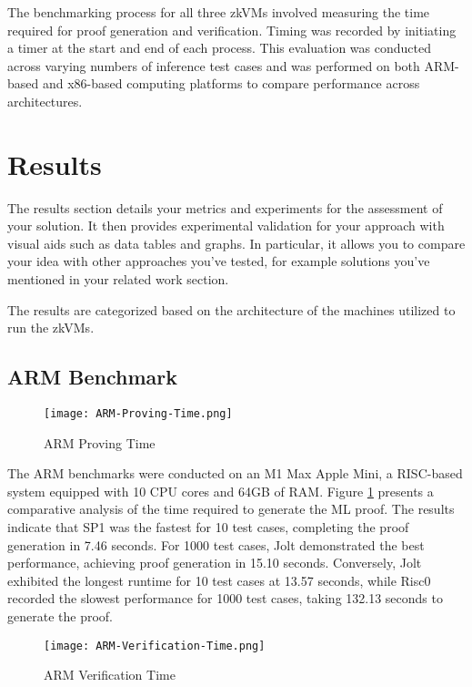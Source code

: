 \documentclass{scrartcl}
\begin{document}
The benchmarking process for all three zkVMs involved measuring the time required for proof generation and verification. Timing was recorded by initiating a timer at the start and end of each process. This evaluation was conducted across varying numbers of inference test cases and was performed on both ARM-based and x86-based computing platforms to compare performance across architectures.

\section{Results}

The results section details your metrics and experiments for the assessment of your solution. It then provides experimental validation for your approach with visual aids such as data tables and graphs. In particular, it allows you to compare your idea with other approaches you've tested, for example solutions you've mentioned in your related work section.

The results are categorized based on the architecture of the machines utilized to run the zkVMs. \subsection{ARM Benchmark}

\begin{figure}
	\begin{center}
		\texttt{[image: ARM-Proving-Time.png]}
	\end{center}
	\caption{ARM Proving Time}
	\label{graph:arm-proving-time}
\end{figure}

The ARM benchmarks were conducted on an M1 Max Apple Mini, a RISC-based system equipped with 10 CPU cores and 64GB of RAM. Figure \ref{graph:arm-proving-time} presents a comparative analysis of the time required to generate the ML proof. The results indicate that SP1 was the fastest for 10 test cases, completing the proof generation in 7.46 seconds. For 1000 test cases, Jolt demonstrated the best performance, achieving proof generation in 15.10 seconds. Conversely, Jolt exhibited the longest runtime for 10 test cases at 13.57 seconds, while Risc0 recorded the slowest performance for 1000 test cases, taking 132.13 seconds to generate the proof.

\begin{figure}
	\begin{center}
		\texttt{[image: ARM-Verification-Time.png]}
	\end{center}
	\caption{ARM Verification Time}
	\label{graph:arm-verification-time}
\end{figure}
\end{document}
